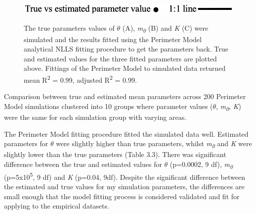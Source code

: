 {\begin{figure}[htbp]
\includegraphics[width=.6\textwidth]{Legend2.png}\\
\caption{The true parameters values of $\theta$ (A), \textit{m\textsubscript{0}} (B) and \textit{K} (C) were simulated and the results fitted using the Perimeter Model analytical NLLS fitting procedure to get the parameters back. True and estimated values for the three fitted parameters are plotted above. Fittings of the Perimeter Model to simulated data returned mean R\textsuperscript{2} = 0.99, adjusted R\textsuperscript{2} = 0.99.}
\label{fig:myfig}
\end{figure}

\begin{table}[h!]
  \begin{center}
    \caption{Comparison between true and estimated mean parameters across 200 Perimeter Model simulations clustered into 10 groups where parameter values ($\theta$, \textit{m\textsubscript{0}}, \textit{K}) were the same for each simulation group with varying areas.}
    \label{table5}
  \end{center}
\end{table}

\noindent The Perimeter Model fitting procedure fitted the simulated data well. Estimated parameters for $\theta$ were slightly higher than true parameters, whilst \textit{m\textsubscript{0}} and \textit{K} were slightly lower than the true parameters (Table 3.3). There was significant difference between the true and estimated values for $\theta$ (p=0.0002, 9 df), \textit{m\textsubscript{0}} (p=5x10\textsuperscript{5}, 9 df) and \textit{K} (p=0.04, 9df). Despite the significant difference between the estimated and true values for my simulation parameters, the differences are small enough that the model fitting process is considered validated and fit for applying to the empirical datasets.   

}
